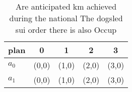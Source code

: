 \documentclass[a4paper]{article}
\begin{document}
\begin{table}
\begin{adjustbox}{width=0.5\columnwidth}
\begin{tabular}{|l|l|l|l|l|}
\hline
\textbf{plan} & \multicolumn{1}{c|}{\textbf{0}} & \multicolumn{1}{c|}{\textbf{1}} & \multicolumn{1}{c|}{\textbf{2}} & \multicolumn{1}{c|}{\textbf{3}} \\ \hline
\textbf{$a_0$}  & (0,0) & (1,0) & (2,0) & (3,0) \\ \hline
\textbf{$a_1$}  & (0,0) & (1,0) & (2,0) & (3,0) \\ \hline
\end{tabular}
\end{adjustbox}
\caption{Are anticipated km achieved during the national The dogsled sui order there is also Occup
}
\end{table}
\end{document}
